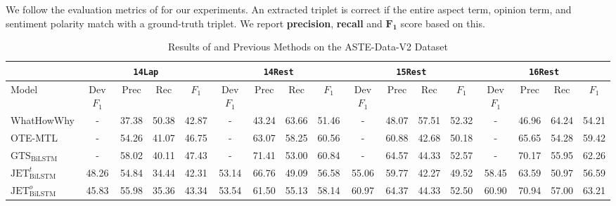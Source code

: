 \documentclass[sigconf]{acmart}
\begin{document}
We follow the evaluation metrics of \citet{xu2020position} for our experiments. An extracted triplet is correct if the entire aspect term, opinion term, and sentiment polarity match with a ground-truth triplet. We report \textbf{precision}, \textbf{recall} and $\mathbf{F_1}$ score based on this.








\begin{table*}[ht!]
\small
\caption{Results of \mymodel{} and Previous Methods on the ASTE-Data-V2 Dataset}
\resizebox{0.8\linewidth}{!}
{
\label{tab:main_results}
\centering
\begin{tabular}{l|cccc|cccc|cccc|cccc}
\toprule
     & \multicolumn{4}{c|}{\texttt{14Lap}}                & \multicolumn{4}{c|}{\texttt{14Rest}}         
     & \multicolumn{4}{c|}{\texttt{15Rest}} 
     & \multicolumn{4}{c}{\texttt{16Rest}} \\ \hline
Model            & Dev $F_1$                & Prec                 & Rec                  & $F_1$                    & Dev $F_1$                & Prec                 & Rec                  & $F_1$             & Dev $F_1$                & Prec                 & Rec                  & $F_1$       & Dev $F_1$                & Prec                 & Rec                  & $F_1$              \\ \midrule
WhatHowWhy \cite{peng2020knowing} &            -           & 37.38                 & 50.38                 & 42.87                 &           -            & 43.24                 & 63.66                 & 51.46                 & - & 48.07	& 57.51	& 52.32 & - & 46.96	& 64.24	& 54.21\\
OTE-MTL \cite{zhang2020multi} & - & 54.26 & 41.07 & 46.75 & - & 63.07 & 58.25 & 60.56 & - & 60.88 & 42.68 & 50.18 & - & 65.65 & 54.28 & 59.42 \\
$\mathrm{GTS}_{\mathrm{BiLSTM}}$ \cite{wu2020grid} & - & 58.02 & 40.11 & 47.43 & - & 71.41 & 53.00 & 60.84 & - & 64.57 & 44.33 & 52.57 & - & 70.17 & 55.95 & 62.26 \\
$\mathrm{JET}_{\mathrm{BiLSTM}}^{t}$ \cite{xu2020position}             &  48.26  & 54.84                  & 34.44                 & 42.31                 & 53.14 & 66.76                 & 49.09                 & 56.58      & 55.06 & 59.77 & 42.27 & 49.52         & 58.45 & 63.59 & 50.97 & 56.59 \\ 
$\mathrm{JET}_{\mathrm{BiLSTM}}^{o}$ \cite{xu2020position}             &  45.83  & 55.98                  & 35.36                 & 43.34                 & 53.54 & 61.50                 & 55.13                 & 58.14   & 60.97   & 64.37	& 44.33	& 52.50       & 60.90  & 70.94	& 57.00	& 63.21 \\

\end{tabular}}
\end{table*}
\end{document}
